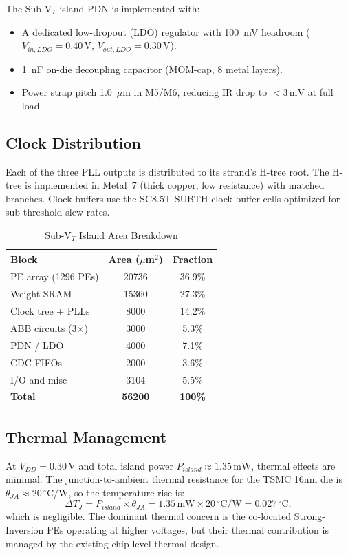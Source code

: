 The Sub-V$_T$ island PDN is implemented with:
\begin{itemize}
  \item A dedicated low-dropout (LDO) regulator with 100~mV headroom ($V_{in,LDO} = 0.40\,\text{V}$,
        $V_{out,LDO} = 0.30\,\text{V}$).
  \item 1~nF on-die decoupling capacitor (MOM-cap, 8 metal layers).
  \item Power strap pitch 1.0~$\mu$m in M5/M6, reducing IR drop to $< 3\,\text{mV}$ at
        full load.
\end{itemize}

\subsection{Clock Distribution}

Each of the three PLL outputs is distributed to its strand's H-tree root.  The H-tree
is implemented in Metal~7 (thick copper, low resistance) with matched branches.  Clock
buffers use the SC8.5T-SUBTH clock-buffer cells optimized for sub-threshold slew rates.

\begin{table}[htbp]
\centering
\caption{Sub-V$_T$ Island Area Breakdown}
\label{tab:area}
\begin{tabular}{lcc}
\hline
Block & Area ($\mu$m$^2$) & Fraction \\
\hline
PE array (1296 PEs) & 20736 & 36.9\% \\
Weight SRAM & 15360 & 27.3\% \\
Clock tree + PLLs & 8000 & 14.2\% \\
ABB circuits (3×) & 3000 &  5.3\% \\
PDN / LDO & 4000 &  7.1\% \\
CDC FIFOs & 2000 &  3.6\% \\
I/O and misc & 3104 &  5.5\% \\
\hline
\textbf{Total} & \textbf{56200} & \textbf{100\%} \\
\hline
\end{tabular}
\end{table}

\subsection{Thermal Management}

At $V_{DD} = 0.30\,\text{V}$ and total island power $P_{island} \approx 1.35\,\text{mW}$,
thermal effects are minimal.  The junction-to-ambient thermal resistance for the TSMC 16nm
die is $\theta_{JA} \approx 20\,^\circ\text{C/W}$, so the temperature rise is:
\[
  \Delta T_J = P_{island} \times \theta_{JA} = 1.35\,\text{mW} \times 20\,^\circ\text{C/W}
             = 0.027\,^\circ\text{C},
\]
which is negligible.  The dominant thermal concern is the co-located Strong-Inversion
PEs operating at higher voltages, but their thermal contribution is managed by the
existing chip-level thermal design.

